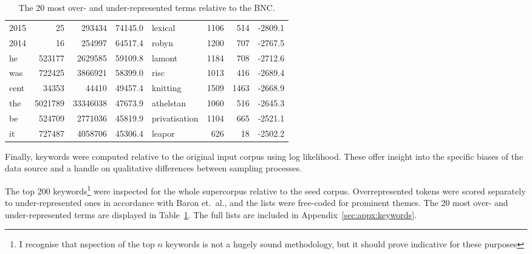\begin{table}[Htb]
\begin{tabular}{|lrrr||lrrr|}
        2015       & 25             & 293434          & 74145.0      & lexical       & 1106           & 514             & -2809.1      \\
        2014       & 16             & 254997          & 64517.4      & robyn         & 1200           & 707             & -2767.5      \\
        he         & 523177         & 2629585         & 59109.8      & lamont        & 1184           & 708             & -2712.6      \\
        was        & 722425         & 3866921         & 58399.0      & risc          & 1013           & 416             & -2689.4      \\
        cent       & 34353          & 44410           & 49457.4      & knitting      & 1509           & 1463            & -2668.9      \\
        the        & 5021789        & 33346038        & 47673.9      & athelstan     & 1060           & 516             & -2645.3      \\
        be         & 524709         & 2771036         & 45819.9      & privatisation & 1104           & 665             & -2521.1      \\
        it         & 727487         & 4058706         & 45306.4      & leapor        & 626            & 18              & -2502.2      \\ \hline
    \end{tabular}

    \caption{The 20 most over- and under-represented terms relative to the BNC.}
    \label{table:evaluation:retrieval:keywords}

\end{table}





Finally, keywords were computed relative to the original input corpus using log likelihood.  These offer insight into the specific biases of the data source and a handle on qualitative differences between sampling processes.  



The top 200 keywords\footnote{I recognise that nspection of the top $n$ keywords is not a hugely sound methodology, but it should prove indicative for these purposes} were inspected for the whole supercorpus relative to the seed corpus. Overrepresented tokens were scored separately to under-represented ones in accordance with Baron et.\ al.\cite{baron2009word}, and the lists were free-coded for prominent themes.  The 20 most over- and under-represented terms are displayed in Table~\ref{table:evaluation:retrieval:keywords}.  The full lists are included in Appendix~\ref{sec:appx:keywords}.

